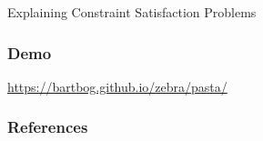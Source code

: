 \documentclass{beamer}
\begin{document}
\begin{frame}{\small{Explaining Constraint Satisfaction Problems}}
    \frametitle{Demo}

    \begin{center}
        {\Large \url{https://bartbog.github.io/zebra/pasta/}}
    \end{center}
    

\end{frame}


\begin{frame}
    \frametitle{References}
    \vspace{2em}
    
\end{frame}
\end{document}
